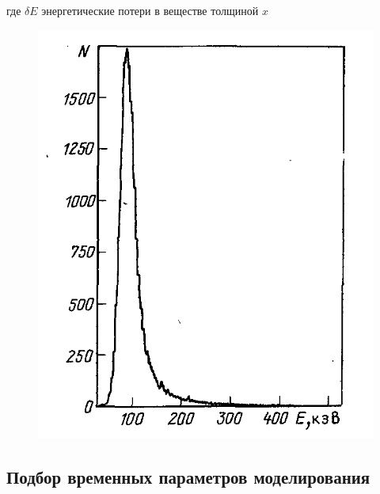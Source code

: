 где $ \delta E $ энергетические потери в веществе толщиной $ x $


\begin{figure}
\centering
\includegraphics[width=0.7\linewidth]{images/landau}
\caption{}
\label{fig:landau}
\end{figure}






\subsection{Подбор временных параметров моделирования}\label{puasson}

